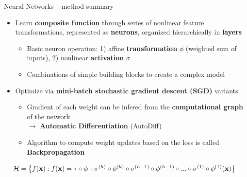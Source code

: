 

\begin{frame}{Neural Networks -- method summary}

 

\medskip

\begin{itemize}
  \item Learn \textbf{composite function} through series of nonlinear feature 
  transformations, represented as \textbf{neurons}, organized hierarchically 
  in \textbf{layers}
  \begin{itemize}
    \item Basic neuron operation: 1) affine \textbf{transformation} $\phi$ (weighted sum of inputs), 
    2) nonlinear \textbf{activation} $\sigma$
    \item Combinations of simple building 
    blocks to create a complex model
  \end{itemize}
  \item Optimize via \textbf{mini-batch stochastic gradient descent (SGD)} variants:
  \begin{itemize}
    \item Gradient of each weight can be infered from the \textbf{computational graph} of the network\\
    $\rightarrow$ \textbf{Automatic Differentiation} (AutoDiff)
    \item Algorithm to compute weight updates based on the loss is called \textbf{Backpropagation}
  \end{itemize}
\end{itemize}

\medskip
 
 ~~
$\mathcal{H} = \left\{ f(\mathbf{x}): f(\mathbf{x}) = \tau \circ \phi \circ \sigma^{(h)} \circ
\phi^{(h)} \circ \sigma^{(h - 1)} \circ \phi^{(h - 1)} \circ ... \circ 
\sigma^{(1)} \circ \phi^{(1)} (\mathbf{x}) \right\}$


\end{frame}
